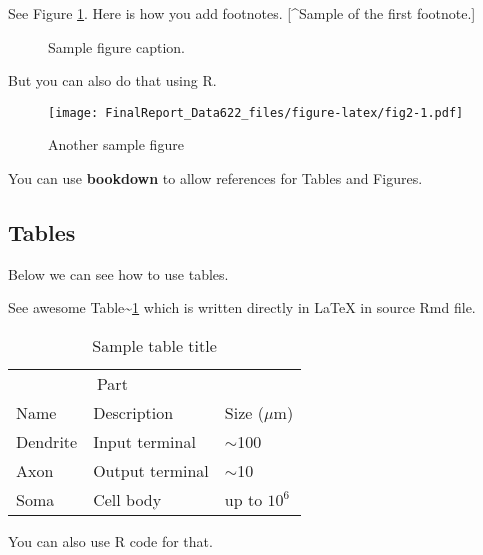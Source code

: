 \documentclass{article}
\newenvironment{Shaded}{\begin{snugshade}}{\end{snugshade}}
\newcommand{\FunctionTok}[1]{\textcolor[rgb]{0.00,0.00,0.00}{#1}}
\newcommand{\NormalTok}[1]{#1}
\newcommand{\SpecialCharTok}[1]{\textcolor[rgb]{0.00,0.00,0.00}{#1}}
\begin{document}
See Figure \ref{fig:fig1}. Here is how you add footnotes. {[}\^{}Sample
of the first footnote.{]}

\begin{figure}
  \centering
  \fbox{\rule[-.5cm]{4cm}{4cm} \rule[-.5cm]{4cm}{0cm}}
  \caption{Sample figure caption.}
  \label{fig:fig1}
\end{figure}

But you can also do that using R.

\begin{Shaded}
\end{Shaded}

\begin{figure}
\centering
\texttt{[image: FinalReport\_Data622\_files/figure-latex/fig2-1.pdf]}
\caption{Another sample figure}
\end{figure}

You can use \textbf{bookdown} to allow references for Tables and
Figures.

\hypertarget{tables}{%
\subsection{Tables}\label{tables}}

Below we can see how to use tables.

See awesome Table\textasciitilde{}\ref{tab:table} which is written
directly in LaTeX in source Rmd file.

\begin{table}
 \caption{Sample table title}
  \centering
  \begin{tabular}{lll}
    \toprule
    \multicolumn{2}{c}{Part}                   \\
    \cmidrule(r){1-2}
    Name     & Description     & Size ($\mu$m) \\
    \midrule
    Dendrite & Input terminal  & $\sim$100     \\
    Axon     & Output terminal & $\sim$10      \\
    Soma     & Cell body       & up to $10^6$  \\
    \bottomrule
  \end{tabular}
  \label{tab:table}
\end{table}

You can also use R code for that.
\end{document}

